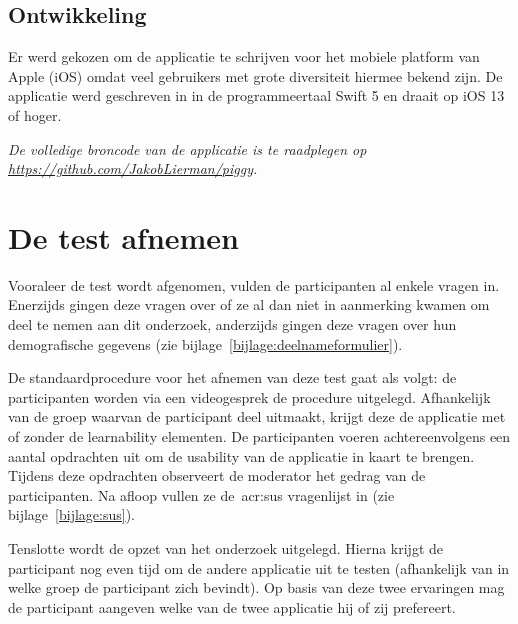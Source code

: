 
\subsection{Ontwikkeling}
\label{sec:applicatie:ontwikkeling}

Er werd gekozen om de applicatie te schrijven voor het mobiele platform van Apple (iOS) omdat veel gebruikers met grote diversiteit hiermee bekend zijn. De applicatie werd geschreven in in de programmeertaal Swift 5 en draait op iOS 13 of hoger.

\textit{De volledige broncode van de applicatie is te raadplegen op \url{https://github.com/JakobLierman/piggy}.}

\section{De test afnemen}
\label{sec:test-afnemen}

Vooraleer de test wordt afgenomen, vulden de participanten al enkele vragen in. Enerzijds gingen deze vragen over of ze al dan niet in aanmerking kwamen om deel te nemen aan dit onderzoek, anderzijds gingen deze vragen over hun demografische gegevens (zie bijlage~\ref{bijlage:deelnameformulier}).

De standaardprocedure voor het afnemen van deze test gaat als volgt: de participanten worden via een videogesprek de procedure uitgelegd. Afhankelijk van de groep waarvan de participant deel uitmaakt, krijgt deze de applicatie met of zonder de learnability elementen. De participanten voeren achtereenvolgens een aantal opdrachten uit om de usability van de applicatie in kaart te brengen. Tijdens deze opdrachten observeert de moderator het gedrag van de participanten. Na afloop vullen ze de~\acrshort{acr:sus} vragenlijst in (zie bijlage~\ref{bijlage:sus}).

Tenslotte wordt de opzet van het onderzoek uitgelegd. Hierna krijgt de participant nog even tijd om de andere applicatie uit te testen (afhankelijk van in welke groep de participant zich bevindt). Op basis van deze twee ervaringen mag de participant aangeven welke van de twee applicatie hij of zij prefereert.
